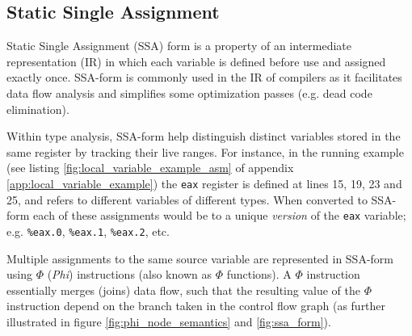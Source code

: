 
\subsection{Static Single Assignment}

Static Single Assignment (SSA) form is a property of an intermediate representation (IR) in which each variable is defined before use and assigned exactly once. SSA-form is commonly used in the IR of compilers as it facilitates data flow analysis and simplifies some optimization passes (e.g. dead code elimination).


Within type analysis, SSA-form help distinguish distinct variables stored in the same register by tracking their live ranges. For instance, in the running example (see listing \ref{fig:local_variable_example_asm} of appendix \ref{app:local_variable_example}) the \texttt{eax} register is defined at lines 15, 19, 23 and 25, and refers to different variables of different types. When converted to SSA-form each of these assignments would be to a unique \textit{version} of the \texttt{eax} variable; e.g. \texttt{\%eax.0}, \texttt{\%eax.1}, \texttt{\%eax.2}, etc.

Multiple assignments to the same source variable are represented in SSA-form using $\Phi$ (\textit{Phi}) instructions (also known as $\Phi$ functions). A $\Phi$ instruction essentially merges (joins) data flow, such that the resulting value of the $\Phi$ instruction depend on the branch taken in the control flow graph (as further illustrated in figure \ref{fig:phi_node_semantics} and \ref{fig:ssa_form}).

